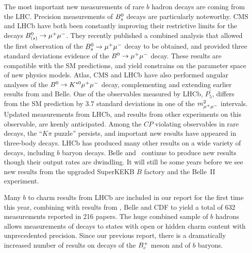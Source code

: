 The most important new measurements of rare $b$ hadron decays are coming from the LHC. 
Precision measurements of $B^0_s$ decays are particularly noteworthy. 
CMS and LHCb have both been constantly improving their restrictive
limits for the decays $B^0_{(s)}\to\mu^+\mu^-$. 
They recently published a combined analysis that allowed the first observation of the $B^0_s\to\mu^+\mu^-$ decay to be obtained, and provided three standard deviations evidence of the $B^0\to\mu^+\mu^-$ decay. 
These results are compatible with the SM predictions, and yield constrains on the parameter space of new physics models.
Atlas, CMS and LHCb have also performed angular analyses of the $B^0\to K^{*0}\mu^+\mu^-$ decay, complementing and extending earlier results from \babar and Belle. 
One of the observables measured by LHCb, $P_5^{\prime}$, differs from the SM prediction by 3.7 standard deviations in one of the $m^2_{\mu^+\mu^-}$ intervals.
Updated measurements from LHCb, and results from other experiments on this observable, are keenly anticipated.
Among the $CP$ violating observables in rare decays, the ``$K\pi$ puzzle'' persists, and important new results have appeared in three-body decays.
LHCb has produced many other results on a wide variety of decays, including $b$ baryon decays. %
Belle and \babar\ continue to produce new results though their output rates are dwindling.  
It will still be some years before we see new results from the upgraded SuperKEKB $B$ factory and the Belle~II experiment.

Many $b$ to charm results from LHCb are included in our report for the  
first time this year, combining with results from \babar, Belle and CDF to yield a total of 632 measurements reported in 216 papers.
The huge combined sample of $b$ hadrons allows measurements of decays to states with open or hidden charm content with unprecedented precision.
Since our previous report, there is a dramatically increased number of results on decays of the $B^+_c$ meson and of $b$ baryons.

